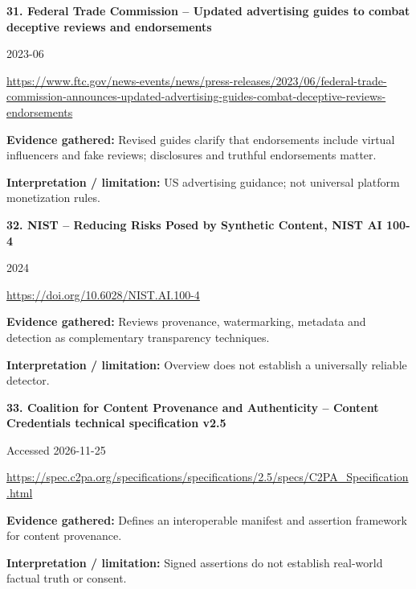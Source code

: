 \documentclass[11pt,a4paper]{article}
\begin{document}
\noindent\begin{minipage}{\linewidth}\textbf{31. Federal Trade Commission -- Updated advertising guides to combat deceptive reviews and endorsements}\par{\small 2023-06\par\url{https://www.ftc.gov/news-events/news/press-releases/2023/06/federal-trade-commission-announces-updated-advertising-guides-combat-deceptive-reviews-endorsements}}\par
\textbf{Evidence gathered:} Revised guides clarify that endorsements include virtual influencers and fake reviews; disclosures and truthful endorsements matter.\par\textbf{Interpretation / limitation:} US advertising guidance; not universal platform monetization rules.\par
\end{minipage}\par\vspace{2mm}
\noindent\begin{minipage}{\linewidth}\textbf{32. NIST -- Reducing Risks Posed by Synthetic Content, NIST AI 100-4}\par{\small 2024\par\url{https://doi.org/10.6028/NIST.AI.100-4}}\par
\textbf{Evidence gathered:} Reviews provenance, watermarking, metadata and detection as complementary transparency techniques.\par\textbf{Interpretation / limitation:} Overview does not establish a universally reliable detector.\par
\end{minipage}\par\vspace{2mm}
\noindent\begin{minipage}{\linewidth}\textbf{33. Coalition for Content Provenance and Authenticity -- Content Credentials technical specification v2.5}\par{\small Accessed 2026-11-25\par\url{https://spec.c2pa.org/specifications/specifications/2.5/specs/C2PA_Specification.html}}\par
\textbf{Evidence gathered:} Defines an interoperable manifest and assertion framework for content provenance.\par\textbf{Interpretation / limitation:} Signed assertions do not establish real-world factual truth or consent.\par
\end{minipage}\par\vspace{2mm}
\end{document}
